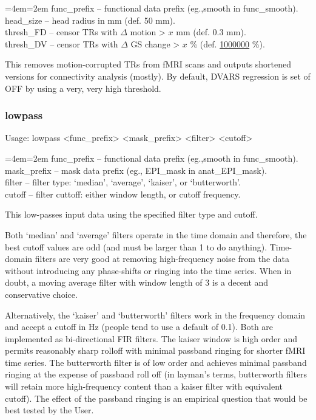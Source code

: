 \documentclass[final,titlepage,letterpaper,oneside,12pt]{article}
\renewcommand{\texttt}[2][BrickRed]{\textcolor{#1}{\ttfamily #2}}%
\newenvironment{blockquote}{%
  \par%
  \medskip
  \leftskip=4em\rightskip=2em%
  \noindent\ignorespaces}{%
  \par\medskip}
\begin{document}
\begin{blockquote}
func\_prefix -- functional data prefix (eg.,smooth in func\_smooth). \\
head\_size -- head radius in mm (def. 50 mm). \\
thresh\_FD -- censor TRs with $\Delta$ motion > $x$ mm (def. 0.3 mm). \\
thresh\_DV -- censor TRs with $\Delta$ GS change > $x$ \% (def. \href{http://upload.wikimedia.org/wikipedia/en/1/16/Drevil_million_dollars.jpg}{1000000} \%). \
\end{blockquote}

\noindent This removes motion-corrupted TRs from fMRI scans and outputs shortened versions for connectivity analysis (mostly). By default, DVARS regression is set of OFF by using a very, very high threshold.

\subsubsection{lowpass}
Usage: \texttt{lowpass <func\_prefix> <mask\_prefix> <filter> <cutoff>}

\begin{blockquote}
func\_prefix -- functional data prefix (eg.,smooth in func\_smooth). \\
mask\_prefix -- mask data prefix (eg., EPI\_mask in anat\_EPI\_mask). \\
filter -- filter type: `median', `average', `kaiser', or `butterworth'. \\
cutoff -- filter cuttoff: either window length, or cutoff frequency. \
\end{blockquote}

\noindent This low-passes input data using the specified filter type and cutoff. 

Both `median' and `average' filters operate in the time domain and therefore, the best cutoff values are odd (and must be larger than 1 to do anything). Time-domain filters are very good at removing high-frequency noise from the data without introducing any phase-shifts or ringing into the time series. When in doubt, a moving average filter with window length of 3 is a decent and conservative choice.

Alternatively, the `kaiser' and `butterworth' filters work in the frequency domain and accept a cutoff in Hz (people tend to use a default of 0.1). Both are implemented as bi-directional FIR filters. The kaiser window is high order and permits reasonably sharp rolloff with minimal passband ringing for shorter fMRI time series. The butterworth filter is of low order and achieves minimal passband ringing at the expense of passband roll off (in layman's terms, butterworth filters will retain more high-frequency content than a kaiser filter with equivalent cutoff). The effect of the passband ringing is an empirical question that would be best tested by the User.
\end{document}
